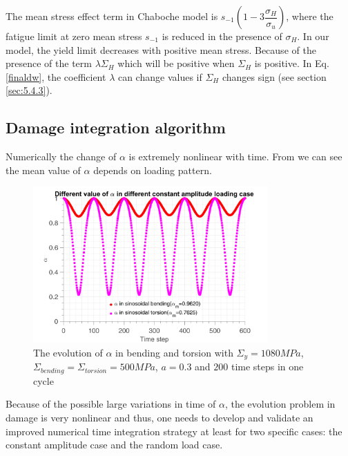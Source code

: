 The mean stress effect term in Chaboche model is $s_{-1}\left(1-3\dfrac{\sigma_H}{\sigma_u} \right)$, where the fatigue limit at zero mean stress $s_{-1}$ is reduced in the presence of $\sigma_H$. In our model, the yield limit decreases with positive mean stress. Because of the presence of the term $\lambda \Sigma_H$ which will be positive when $\Sigma_H$ is positive. In Eq.\ref{finaldw}, the coefficient $\lambda$ can change values if $\Sigma_H$ changes sign (see section \ref{sec:5.4.3}).


\subsection{Damage integration algorithm}

Numerically the  change of $\alpha$ is extremely nonlinear with time. From  we can see the mean value of $\alpha$ depends on loading pattern. 

\begin{figure}[!h]
	\centering
	\includegraphics[width=0.8\textwidth]{figures//alp_mean_methods.png} 
	\caption{The evolution of $\alpha$ in bending and torsion with $\Sigma_y=1080 MPa$, $\Sigma_{bending}=\Sigma_{torsion}=500 MPa$, $a=0.3$ and $200$ time steps in one cycle}
	\label{fig.alpmean}
\end{figure}


Because of the possible large variations in time  of $\alpha$, the evolution problem in damage is very nonlinear and thus, one needs to develop and validate an improved numerical time integration strategy at least  for two specific cases: the constant amplitude case and the random load case.

